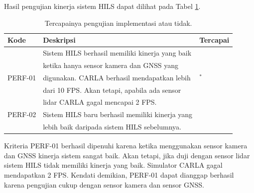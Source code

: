 Hasil pengujian kinerja sistem HILS dapat dilihat pada Tabel \ref{chapter-4-tbl-perf-criteria-result}.
\begin{table}[!htbp]
	\begin{center}
		\begin{tabular}{|l|l|l|}
			\hline
			\textbf{Kode} & \textbf{Deskripsi}                              & \textbf{Tercapai} \\
			\hline
			              & Sistem HILS berhasil memiliki kinerja yang baik &                   \\
			              & ketika hanya sensor kamera dan GNSS yang        &                   \\
			PERF-01       & digunakan. CARLA berhasil mendapatkan lebih     & \checkmark$^*$    \\
			              & dari 10 FPS. Akan tetapi, apabila ada sensor    &                   \\
			              & lidar CARLA gagal mencapai 2 FPS.               &                   \\
			\hline
			PERF-02       & Sistem HILS baru berhasil memiliki kinerja yang & \checkmark        \\
			              & lebih baik daripada sistem HILS sebelumnya.     &                   \\
			\hline
		\end{tabular}
	\end{center}

	\caption{Tercapainya pengujian implementasi atau tidak.}
	\label{chapter-4-tbl-perf-criteria-result}
\end{table}

Kriteria PERF-01 berhasil dipenuhi karena ketika menggunakan sensor kamera dan
GNSS kinerja sistem sangat baik. Akan tetapi, jika duji dengan sensor lidar
sistem HILS tidak memiliki kinerja yang baik. Simulator CARLA gagal mendapatkan
2 FPS. Kendati demikian, PERF-01 dapat dianggap berhasil karena pengujian cukup
dengan sensor kamera dan  sensor GNSS.

